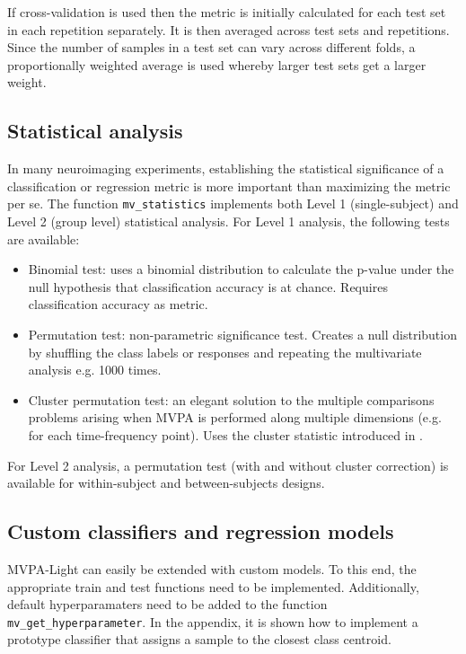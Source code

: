 \documentclass[utf8]{frontiersSCNS} %
\newcommand{\ttt}[1]{\texttt{#1}}
\begin{document}
If cross-validation is used then the metric is initially calculated for each test set in each repetition separately. It is then averaged across test sets and repetitions. Since the number of samples in a test set can vary across different folds, a proportionally weighted average is used whereby larger test sets get a larger weight.

\subsection{Statistical analysis}\label{sec:statistics}

In many neuroimaging experiments, establishing the statistical significance of a classification or regression metric is more important than maximizing the metric per se. The function \ttt{mv\_statistics} implements both Level 1 (single-subject) and Level 2 (group level) statistical analysis. For Level 1 analysis, the following tests are available:

\begin{itemize}
    \item Binomial test: uses a binomial distribution to calculate the p-value under the null hypothesis that classification accuracy is at chance. Requires classification accuracy as metric.
    \item Permutation test: non-parametric significance test. Creates a null distribution by shuffling the class labels or responses and repeating the multivariate analysis e.g. 1000 times. 
    \item Cluster permutation test: an elegant solution to the multiple comparisons problems arising when MVPA is performed along multiple dimensions (e.g. for each time-frequency point). Uses the cluster statistic introduced in 
    \cite{Maris2007}.
\end{itemize}

For Level 2 analysis, a permutation test (with and without cluster correction) is available for within-subject and between-subjects designs.

\subsection{Custom classifiers and regression models}

MVPA-Light can easily be extended with custom models. To this end, the appropriate train and test functions need to be implemented. Additionally, default hyperparamaters need to be added to the function \ttt{mv\_get\_hyperparameter}. In the appendix, it is shown how to implement a prototype classifier that assigns a sample to the closest class centroid.
\end{document}

